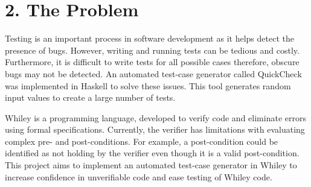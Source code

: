 \documentclass[11pt, a4paper, twoside, openright]{report}
\begin{document}
%
%
%

\section*{2. The Problem}

Testing is an important process in software development as it helps detect the presence of bugs. However, writing and running tests can be tedious and costly. Furthermore, it is difficult to write tests for all possible cases therefore, obscure bugs may not be detected. An automated test-case generator called QuickCheck was implemented in Haskell to solve these issues. This tool generates random input values to create a large number of tests.


Whiley is a programming language, developed to verify code and eliminate errors using formal specifications. Currently, the verifier has limitations with evaluating complex pre- and post-conditions. For example, a post-condition could be identified as not holding by the verifier even though it is a valid post-condition. This project aims to implement an automated test-case generator in Whiley to increase confidence in unverifiable code and ease testing of Whiley code.
\end{document}
